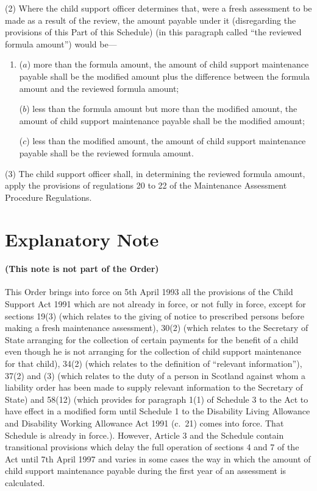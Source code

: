 \documentclass[a4paper]{article}
\newcommand{\parthead}{}
\begin{document}
(2) Where the child support officer determines that, were a fresh assessment to be made as a result of the review, the amount payable under it (disregarding the provisions of this Part of this Schedule) (in this paragraph called “the reviewed formula amount”) would be—
\begin{enumerate}\item[]
($a$) more than the formula amount, the amount of child support maintenance payable shall be the modified amount plus the difference between the formula amount and the reviewed formula amount;

($b$) less than the formula amount but more than the modified amount, the amount of child support maintenance payable shall be the modified amount;

($c$) less than the modified amount, the amount of child support maintenance payable shall be the reviewed formula amount.
\end{enumerate}

(3) The child support officer shall, in determining the reviewed formula amount, apply the provisions of regulations 20 to 22 of the Maintenance Assessment Procedure Regulations.

\part{Explanatory Note}

\renewcommand\parthead{--- Explanatory Note}

\subsection*{(This note is not part of the Order)}

 This Order brings into force on 5th April 1993 all the provisions of the Child Support Act 1991 which are not already in force, or not fully in force, except for sections 19(3) (which relates to the giving of notice to prescribed persons before making a fresh maintenance assessment), 30(2) (which relates to the Secretary of State arranging for the collection of certain payments for the benefit of a child even though he is not arranging for the collection of child support maintenance for that child), 34(2) (which relates to the definition of “relevant information”), 37(2) and (3) (which relates to the duty of a person in Scotland against whom a liability order has been made to supply relevant information to the Secretary of State) and 58(12) (which provides for paragraph 1(1) of Schedule 3 to the Act to have effect in a modified form until Schedule 1 to the Disability Living Allowance and Disability Working Allowance Act 1991 (c.\ 21) comes into force. That Schedule is already in force.). However, Article 3 and the Schedule contain transitional provisions which delay the full operation of sections 4 and 7 of the Act until 7th April 1997 and varies in some cases the way in which the amount of child support maintenance payable during the first year of an assessment is calculated.
\end{document}
